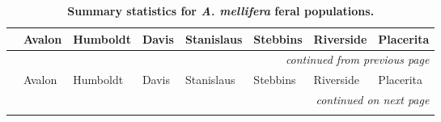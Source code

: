 \documentclass[a4paper, 12pt]{article}
\begin{document}
\newpage


\begin{tiny}
\begin{longtable}{p{3.0cm}p{1.0cm}p{1.0cm}p{1.0cm}p{1.0cm}p{1.0cm}p{1.0cm}p{1.0cm}}
\caption{\textbf{\small Summary statistics for \textit{A. mellifera} feral populations.}}\label{tab:sumstats_bee} \\

\hline & \multicolumn{1}{l}{Avalon} & \multicolumn{1}{l}{Humboldt} & \multicolumn{1}{l}{Davis} & \multicolumn{1}{l}{Stanislaus} & \multicolumn{1}{l}{Stebbins} & \multicolumn{1}{l}{Riverside} & \multicolumn{1}{l}{Placerita} \\ \hline 
\endfirsthead

\multicolumn{8}{r}{\textit{continued from previous page}} \\
\hline \multicolumn{1}{r}{} & \multicolumn{1}{l}{Avalon} & \multicolumn{1}{l}{Humboldt} & \multicolumn{1}{l}{Davis} & \multicolumn{1}{l}{Stanislaus} & \multicolumn{1}{l}{Stebbins} & \multicolumn{1}{l}{Riverside} & \multicolumn{1}{l}{Placerita} \\ \hline 
\endhead

\hline \multicolumn{8}{r}{\textit{continued on next page}} \\
\endfoot

\hline
\endlastfoot


\end{longtable}
\end{tiny}
\end{document}
